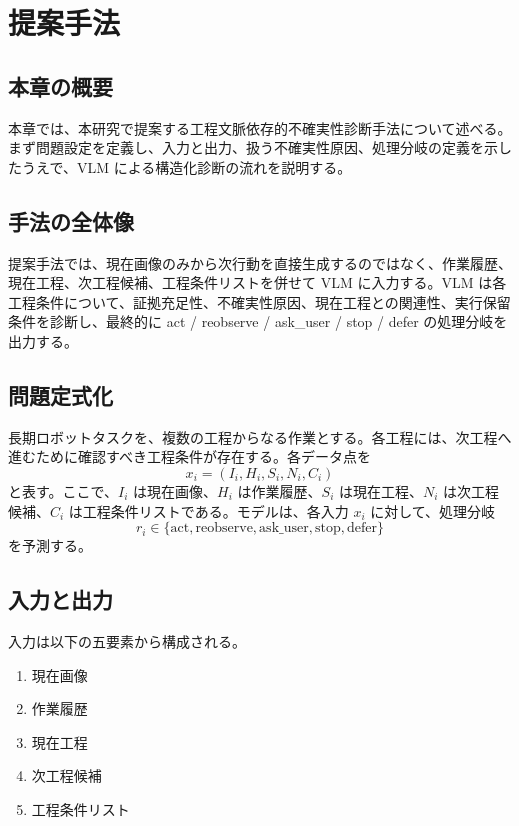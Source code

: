 \chapter{提案手法}

\section{本章の概要}

本章では、本研究で提案する工程文脈依存的不確実性診断手法について述べる。まず問題設定を定義し、入力と出力、扱う不確実性原因、処理分岐の定義を示したうえで、VLM による構造化診断の流れを説明する。

\section{手法の全体像}

提案手法では、現在画像のみから次行動を直接生成するのではなく、作業履歴、現在工程、次工程候補、工程条件リストを併せて VLM に入力する。VLM は各工程条件について、証拠充足性、不確実性原因、現在工程との関連性、実行保留条件を診断し、最終的に act / reobserve / ask\_user / stop / defer の処理分岐を出力する。

\section{問題定式化}

長期ロボットタスクを、複数の工程からなる作業とする。各工程には、次工程へ進むために確認すべき工程条件が存在する。各データ点を
\begin{equation}
  x_i = (I_i, H_i, S_i, N_i, C_i)
  \label{eq:input}
\end{equation}
と表す。ここで、$I_i$ は現在画像、$H_i$ は作業履歴、$S_i$ は現在工程、$N_i$ は次工程候補、$C_i$ は工程条件リストである。モデルは、各入力 $x_i$ に対して、処理分岐
\begin{equation}
  r_i \in \{\mathrm{act}, \mathrm{reobserve}, \mathrm{ask\_user}, \mathrm{stop}, \mathrm{defer}\}
  \label{eq:resolution}
\end{equation}
を予測する。

\section{入力と出力}

入力は以下の五要素から構成される。
\begin{enumerate}
  \item 現在画像
  \item 作業履歴
  \item 現在工程
  \item 次工程候補
  \item 工程条件リスト
\end{enumerate}

